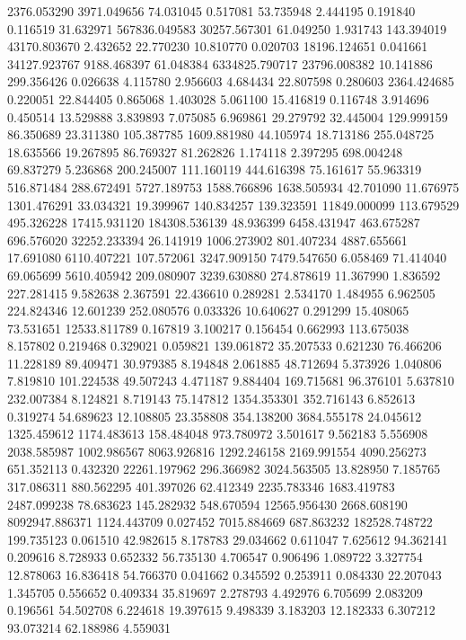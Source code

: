 2376.053290
3971.049656
74.031045
0.517081
53.735948
2.444195
0.191840
0.116519
31.632971
567836.049583
30257.567301
61.049250
1.931743
143.394019
43170.803670
2.432652
22.770230
10.810770
0.020703
18196.124651
0.041661
34127.923767
9188.468397
61.048384
6334825.790717
23796.008382
10.141886
299.356426
0.026638
4.115780
2.956603
4.684434
22.807598
0.280603
2364.424685
0.220051
22.844405
0.865068
1.403028
5.061100
15.416819
0.116748
3.914696
0.450514
13.529888
3.839893
7.075085
6.969861
29.279792
32.445004
129.999159
86.350689
23.311380
105.387785
1609.881980
44.105974
18.713186
255.048725
18.635566
19.267895
86.769327
81.262826
1.174118
2.397295
698.004248
69.837279
5.236868
200.245007
111.160119
444.616398
75.161617
55.963319
516.871484
288.672491
5727.189753
1588.766896
1638.505934
42.701090
11.676975
1301.476291
33.034321
19.399967
140.834257
139.323591
11849.000099
113.679529
495.326228
17415.931120
184308.536139
48.936399
6458.431947
463.675287
696.576020
32252.233394
26.141919
1006.273902
801.407234
4887.655661
17.691080
6110.407221
107.572061
3247.909150
7479.547650
6.058469
71.414040
69.065699
5610.405942
209.080907
3239.630880
274.878619
11.367990
1.836592
227.281415
9.582638
2.367591
22.436610
0.289281
2.534170
1.484955
6.962505
224.824346
12.601239
252.080576
0.033326
10.640627
0.291299
15.408065
73.531651
12533.811789
0.167819
3.100217
0.156454
0.662993
113.675038
8.157802
0.219468
0.329021
0.059821
139.061872
35.207533
0.621230
76.466206
11.228189
89.409471
30.979385
8.194848
2.061885
48.712694
5.373926
1.040806
7.819810
101.224538
49.507243
4.471187
9.884404
169.715681
96.376101
5.637810
232.007384
8.124821
8.719143
75.147812
1354.353301
352.716143
6.852613
0.319274
54.689623
12.108805
23.358808
354.138200
3684.555178
24.045612
1325.459612
1174.483613
158.484048
973.780972
3.501617
9.562183
5.556908
2038.585987
1002.986567
8063.926816
1292.246158
2169.991554
4090.256273
651.352113
0.432320
22261.197962
296.366982
3024.563505
13.828950
7.185765
317.086311
880.562295
401.397026
62.412349
2235.783346
1683.419783
2487.099238
78.683623
145.282932
548.670594
12565.956430
2668.608190
8092947.886371
1124.443709
0.027452
7015.884669
687.863232
182528.748722
199.735123
0.061510
42.982615
8.178783
29.034662
0.611047
7.625612
94.362141
0.209616
8.728933
0.652332
56.735130
4.706547
0.906496
1.089722
3.327754
12.878063
16.836418
54.766370
0.041662
0.345592
0.253911
0.084330
22.207043
1.345705
0.556652
0.409334
35.819697
2.278793
4.492976
6.705699
2.083209
0.196561
54.502708
6.224618
19.397615
9.498339
3.183203
12.182333
6.307212
93.073214
62.188986
4.559031
